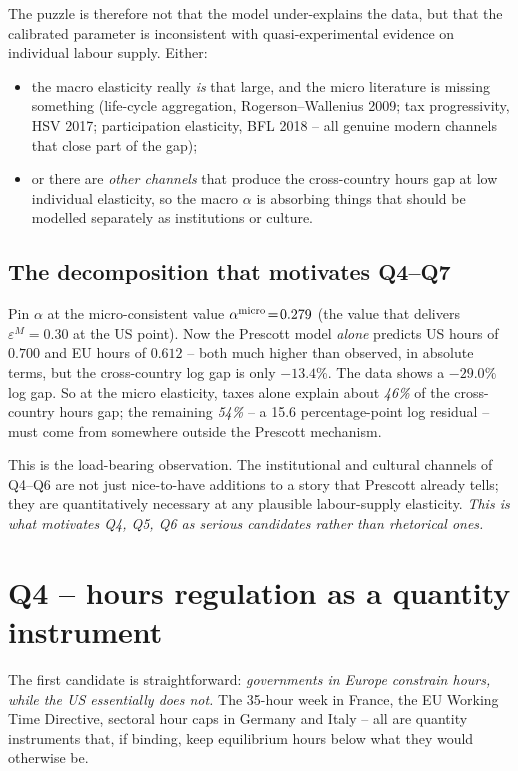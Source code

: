 \documentclass[11pt,a4paper]{article}
\begin{document}
The puzzle is therefore not that the model under-explains the data,
but that the calibrated parameter is inconsistent with quasi-experimental
evidence on individual labour supply. Either:
\begin{itemize}
\item the macro elasticity really \emph{is} that large, and the micro
literature is missing something (life-cycle aggregation,
Rogerson--Wallenius 2009; tax progressivity, HSV 2017; participation
elasticity, BFL 2018 -- all genuine modern channels that close part of
the gap);
\item or there are \emph{other channels} that produce the cross-country
hours gap at low individual elasticity, so the macro $\alpha$ is
absorbing things that should be modelled separately as institutions or
culture.
\end{itemize}

\subsection{The decomposition that motivates Q4--Q7}

Pin $\alpha$ at the micro-consistent value
$\alpha^{\rm micro}\!=\!0.279$ (the value that delivers
$\varepsilon^M\!=\!0.30$ at the US point). Now the Prescott model
\emph{alone} predicts US hours of $0.700$ and EU hours of $0.612$ -- both
much higher than observed, in absolute terms, but the cross-country log
gap is only $-13.4\%$. The data shows a $-29.0\%$ log gap. So at the
micro elasticity, taxes alone explain about \emph{46\%} of the
cross-country hours gap; the remaining \emph{54\%} -- a 15.6
percentage-point log residual -- must come from somewhere outside the
Prescott mechanism.

This is the load-bearing observation. The institutional and cultural
channels of Q4--Q6 are not just nice-to-have additions to a story that
Prescott already tells; they are quantitatively necessary at any
plausible labour-supply elasticity. \emph{This is what motivates Q4,
Q5, Q6 as serious candidates rather than rhetorical ones.}

\section{Q4 -- hours regulation as a quantity instrument}

The first candidate is straightforward: \emph{governments in Europe
constrain hours, while the US essentially does not.} The 35-hour week
in France, the EU Working Time Directive, sectoral hour caps in
Germany and Italy -- all are quantity instruments that, if binding,
keep equilibrium hours below what they would otherwise be.
\end{document}

